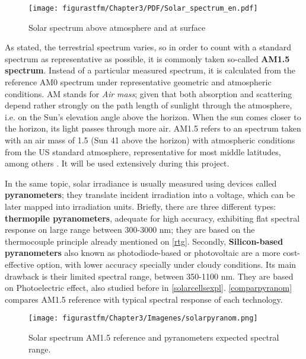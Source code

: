 		\begin{figure} [H] 				
				\centering
				\texttt{[image: figurastfm/Chapter3/PDF/Solar\_spectrum\_en.pdf]}
				\caption{Solar spectrum above atmosphere and at surface \cite{wiki}} \label{spectrumsolaraltura}
			\end{figure}
			
			As stated, the terrestrial spectrum varies, so in order to count with a standard spectrum as representative as possible, it is commonly taken so-called \textbf{\acrshort{AM}1.5 spectrum}. Instead of a particular measured spectrum, it is calculated from the reference AM0 spectrum under representative geometric and atmospheric conditions. \acrshort{AM} stands for \textit{Air mass}; given that both absorption and scattering depend rather strongly on the path length of sunlight through the atmosphere, i.e. on the Sun’s elevation angle above the horizon. When the sun comes closer to the horizon, its light passes through more air. \acrshort{AM}1.5 refers to an spectrum taken with an air mass of 1.5 (Sun 41\textdegree{} above the horizon) with atmospheric conditions from the US standard atmosphere, representative for most middle latitudes, among others \cite{pvlight}. It will be used extensively during this project.
			
			In the same topic, solar irradiance is usually measured using devices called \textbf{pyranometers}; they translate incident irradiation into a voltage, which can be later mapped into irradiation units. Briefly, there are three different types: \textbf{thermopile pyranometers}, adequate for high accuracy, exhibiting flat spectral response on large range between 300-3000 nm; they are based on the thermocouple principle already mentioned on \ref{rtg}. Secondly, \textbf{Silicon-based pyranometers} also known as photodiode-based or photovoltaic are a more cost-effective option, with lower accuracy specially under cloudy conditions. Its main drawback is their limited spectral range, between 350-1100 nm. They are based on Photoelectric effect, also studied before in \ref{solarcellsexpl}. \autoref{comparpyranom} compares \acrshort{AM}1.5 reference with typical spectral response of each technology. 
			
				\begin{figure} [H] 				
				\centering
				\texttt{[image: figurastfm/Chapter3/Imagenes/solarpyranom.png]}
				\caption{Solar spectrum \acrshort{AM}1.5 reference and pyranometers expected spectral range.} \label{comparpyranom}
			\end{figure}
			
